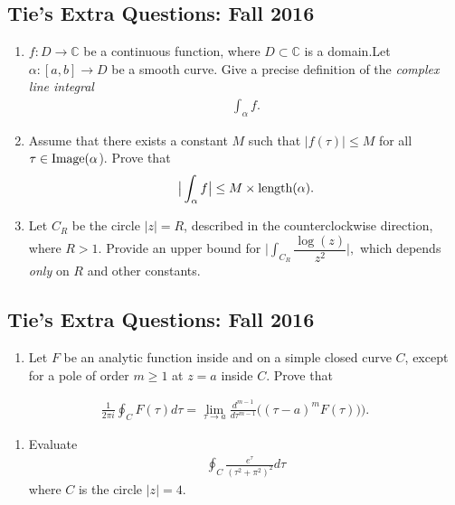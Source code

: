 \hypertarget{ties-extra-questions-fall-2016-3}{%
\subsection{Tie's Extra Questions: Fall
2016}\label{ties-extra-questions-fall-2016-3}}

\begin{enumerate}
\def\labelenumi{\alph{enumi}.}
\item
  \(f: D\rightarrow {\mathbb C}\) be a continuous function, where
  \(D\subset {\mathbb C}\) is a domain.Let \(\alpha:[a,b]\rightarrow D\)
  be a smooth curve. Give a precise definition of the \emph{complex line
  integral}
  \begin{align*}\int_{\alpha} f.\end{align*}
\item
  Assume that there exists a constant \(M\) such that
  \(|f(\tau)|\leq M\) for all \(\tau\in \mbox{\textrm Image}(\alpha\)).
  Prove that
  \begin{align*}\big | \int_{\alpha} f \big |\leq M \times \mbox{\textrm length}(\alpha).\end{align*}
\item
  Let \(C_R\) be the circle \(|z|=R\), described in the counterclockwise
  direction, where \(R>1\). Provide an upper bound for
  \(\big | \int_{C_R} \dfrac{\log{(z)} }{z^2} \big |,\) which depends
  \emph{only} on \(R\) and other constants.
\end{enumerate}

\hypertarget{ties-extra-questions-fall-2016-4}{%
\subsection{Tie's Extra Questions: Fall
2016}\label{ties-extra-questions-fall-2016-4}}

\begin{enumerate}
\def\labelenumi{\alph{enumi}.}
\tightlist
\item
  Let \(F\) be an analytic function inside and on a simple closed curve
  \(C\), except for a pole of order \(m\geq 1\) at \(z=a\) inside \(C\).
  Prove that
\end{enumerate}

\begin{align*}\frac{1}{2 \pi i}\oint_{C} F(\tau) d\tau =
\lim_{\tau\rightarrow a} \frac{d^{m-1}}{d\tau^{m-1}}\big((\tau-a)^m F(\tau))\big).\end{align*}

\begin{enumerate}
\def\labelenumi{\alph{enumi}.}
\setcounter{enumi}{1}
\tightlist
\item
  Evaluate
  \begin{align*}\oint_{C}\frac{e^{\tau}}{(\tau^2+\pi^2)^2}d\tau\end{align*}
  where \(C\) is the circle \(|z|=4\).
\end{enumerate}

